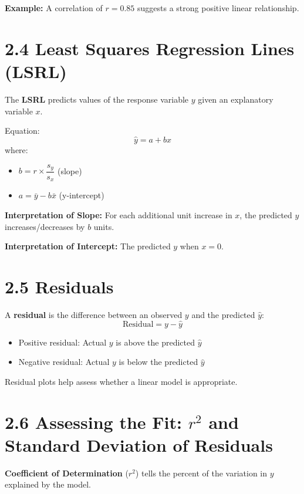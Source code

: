\begin{example}
\textbf{Example:} A correlation of \(r=0.85\) suggests a strong positive linear relationship.
\end{example}

\section*{2.4 Least Squares Regression Lines (LSRL)}

The \textbf{LSRL} predicts values of the response variable \(y\) given an explanatory variable \(x\).

Equation: \[ \hat{y} = a + bx \]
where:
\begin{itemize}
    \item \(b = r \times \dfrac{s_y}{s_x}\) (slope)
    \item \(a = \bar{y} - b\bar{x}\) (y-intercept)
\end{itemize}

\begin{ideaBox}
\textbf{Interpretation of Slope:} For each additional unit increase in \(x\), the predicted \(y\) increases/decreases by \(b\) units.

\textbf{Interpretation of Intercept:} The predicted \(y\) when \(x=0\).
\end{ideaBox}

\section*{2.5 Residuals}

A \textbf{residual} is the difference between an observed \(y\) and the predicted \(\hat{y}\):
\[ \text{Residual} = y - \hat{y} \]

\begin{itemize}
    \item Positive residual: Actual \(y\) is above the predicted \(\hat{y}\)
    \item Negative residual: Actual \(y\) is below the predicted \(\hat{y}\)
\end{itemize}

Residual plots help assess whether a linear model is appropriate.

\section*{2.6 Assessing the Fit: $r^2$ and Standard Deviation of Residuals}

\textbf{Coefficient of Determination} (\(r^2\)) tells the percent of the variation in \(y\) explained by the model.

